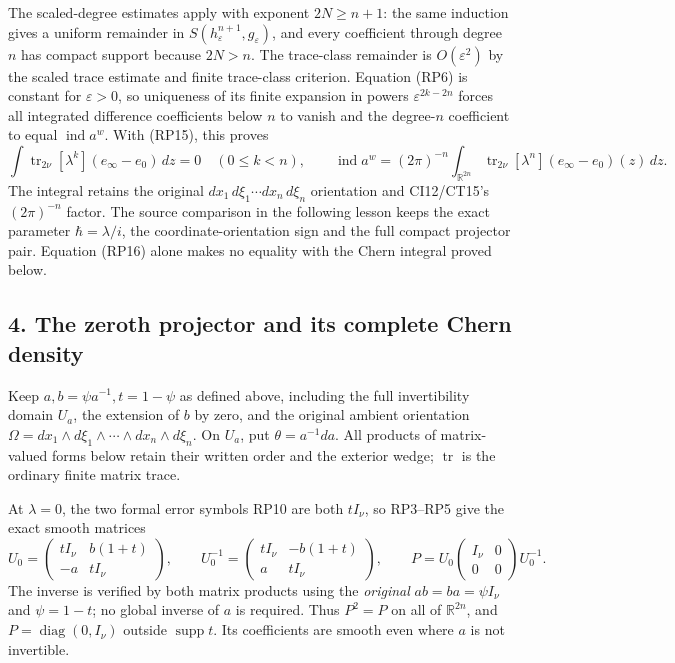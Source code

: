 \documentclass[
  11pt,
]{article}
\begin{document}
The scaled-degree estimates apply with exponent \(2N\ge n+1\): the same
induction gives a uniform remainder in
\(S(h_\varepsilon^{n+1},g_\varepsilon)\), and every coefficient through
degree \(n\) has compact support because \(2N>n\). The trace-class
remainder is \(O(\varepsilon^2)\) by the scaled trace estimate and
finite trace-class criterion. Equation (RP6) is constant for
\(\varepsilon>0\), so uniqueness of its finite expansion in powers
\(\varepsilon^{2k-2n}\) forces all integrated difference coefficients
below \(n\) to vanish and the degree-\(n\) coefficient to equal
\(\operatorname{ind}a^w\). With (RP15), this proves \[
 \int\operatorname{tr}_{2\nu}[\lambda^k](e_\infty-e_0)\,dz=0
      \quad(0\le k<n),\qquad
 \boxed{\displaystyle
 \operatorname{ind}a^w=(2\pi)^{-n}
      \int_{\mathbb R^{2n}}
       \operatorname{tr}_{2\nu}
       [\lambda^n](e_\infty-e_0)(z)\,dz.}
 \tag{RP16}
\] The integral retains the original \(dx_1\,d\xi_1\cdots dx_n\,d\xi_n\)
orientation and CI12/CT15's \((2\pi)^{-n}\) factor. The source
comparison in the following lesson keeps the exact parameter
\(\hbar=\lambda/i\), the coordinate-orientation sign and the full
compact projector pair. Equation (RP16) alone makes no equality with the
Chern integral proved below.

\subsection{4. The zeroth projector and its complete Chern
density}\label{the-zeroth-projector-and-its-complete-chern-density}

Keep \(a,b=\psi a^{-1},t=1-\psi\) as defined above, including the full
invertibility domain \(U_a\), the extension of \(b\) by zero, and the
original ambient orientation
\(\Omega=dx_1\wedge d\xi_1\wedge\cdots\wedge dx_n\wedge d\xi_n\). On
\(U_a\), put \(\theta=a^{-1}da\). All products of matrix-valued forms
below retain their written order and the exterior wedge;
\(\operatorname{tr}\) is the ordinary finite matrix trace.

At \(\lambda=0\), the two formal error symbols RP10 are both \(tI_\nu\),
so RP3--RP5 give the exact smooth matrices \[
 U_0=
  \begin{pmatrix}tI_\nu&b(1+t)\\-a&tI_\nu\end{pmatrix},
 \qquad
 U_0^{-1}=
  \begin{pmatrix}tI_\nu&-b(1+t)\\a&tI_\nu\end{pmatrix},
 \qquad
 P=U_0\begin{pmatrix}I_\nu&0\\0&0\end{pmatrix}U_0^{-1}.
 \tag{CP1}
\] The inverse is verified by both matrix products using the
\emph{original} \(ab=ba=\psi I_\nu\) and \(\psi=1-t\); no global inverse
of \(a\) is required. Thus \(P^2=P\) on all of \(\mathbb R^{2n}\), and
\(P=\operatorname{diag}(0,I_\nu)\) outside \(\operatorname{supp}t\). Its
coefficients are smooth even where \(a\) is not invertible.
\end{document}
